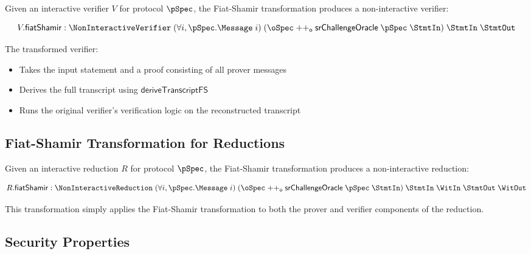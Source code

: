 \begin{definition}
    \label{def:verifier_fiat_shamir}
    Given an interactive verifier $V$ for protocol $\pSpec$, the Fiat-Shamir transformation produces a non-interactive verifier:

    \[ V.\mathsf{fiatShamir} : \NonInteractiveVerifier \;(\forall i, \pSpec.\Message \;i) \;(\oSpec \mathrel{++_\mathsf{o}} \mathsf{srChallengeOracle} \;\pSpec \;\StmtIn) \;\StmtIn \;\StmtOut \]

    The transformed verifier:
    \begin{itemize}
        \item Takes the input statement and a proof consisting of all prover messages
        \item Derives the full transcript using $\mathsf{deriveTranscriptFS}$
        \item Runs the original verifier's verification logic on the reconstructed transcript
    \end{itemize}
\end{definition}

\subsection{Fiat-Shamir Transformation for Reductions}\label{sec:fiat_shamir_reduction}

\begin{definition}
    \label{def:reduction_fiat_shamir}
    Given an interactive reduction $R$ for protocol $\pSpec$, the Fiat-Shamir transformation produces a non-interactive reduction:

    \[ R.\mathsf{fiatShamir} : \NonInteractiveReduction \;(\forall i, \pSpec.\Message \;i) \;(\oSpec \mathrel{++_\mathsf{o}} \mathsf{srChallengeOracle} \;\pSpec \;\StmtIn) \;\StmtIn \;\WitIn \;\StmtOut \;\WitOut \]

    This transformation simply applies the Fiat-Shamir transformation to both the prover and verifier components of the reduction.
\end{definition}

\subsection{Security Properties}\label{sec:fiat_shamir_security}

